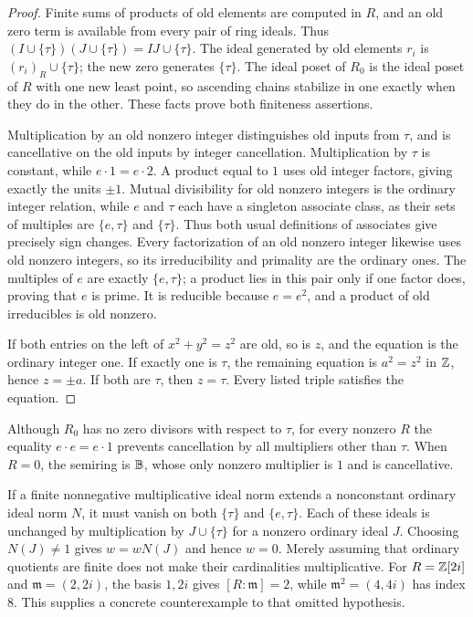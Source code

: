 \begin{proof}
Finite sums of products of old elements are computed in $R$, and an old
zero term is available from every pair of ring ideals. Thus
$(I\cup\{\tau\})(J\cup\{\tau\})=IJ\cup\{\tau\}$. The ideal generated by
old elements $r_i$ is $(r_i)_R\cup\{\tau\}$; the new zero generates
$\{\tau\}$. The ideal poset of $R_0$ is the ideal poset of $R$ with one
new least point, so ascending chains stabilize in one exactly when they
do in the other. These facts prove both finiteness assertions.

Multiplication by an old nonzero integer distinguishes old inputs from
$\tau$, and is cancellative on the old inputs by integer cancellation.
Multiplication by $\tau$ is constant, while $e\cdot1=e\cdot2$.
A product equal to $1$ uses old integer factors, giving exactly the
units $\pm1$. Mutual divisibility for old nonzero integers is the ordinary
integer relation, while $e$ and $\tau$ each have a singleton associate
class, as their sets of multiples are $\{e,\tau\}$ and $\{\tau\}$.
Thus both usual definitions of associates give precisely sign changes.
Every factorization of an old nonzero integer likewise
uses old nonzero integers, so its irreducibility and primality are the
ordinary ones. The multiples of $e$ are exactly $\{e,\tau\}$; a product
lies in this pair only if one factor does, proving that $e$ is prime.
It is reducible because $e=e^2$, and a product of old irreducibles is
old nonzero.

If both entries on the left of $x^2+y^2=z^2$ are old, so is $z$, and the
equation is the ordinary integer one. If exactly one is $\tau$, the
remaining equation is $a^2=z^2$ in $\mathbb Z$, hence $z=\pm a$. If both are
$\tau$, then $z=\tau$. Every listed triple satisfies the equation.
\end{proof}

Although $R_0$ has no zero divisors with respect to $\tau$, for every
nonzero $R$ the equality $e\cdot e=e\cdot1$ prevents cancellation by all
multipliers other than $\tau$. When $R=0$, the semiring is $\mathbb B$, whose
only nonzero multiplier is $1$ and is cancellative.

If a finite nonnegative multiplicative ideal norm extends a nonconstant
ordinary ideal norm $N$, it must vanish on both $\{\tau\}$ and
$\{e,\tau\}$. Each of these ideals is unchanged by multiplication by
$J\cup\{\tau\}$ for a nonzero ordinary ideal $J$. Choosing $N(J)\ne1$
gives $w=wN(J)$ and hence $w=0$. Merely assuming that ordinary quotients
are finite does not make their cardinalities multiplicative. For
$R=\mathbb Z[2i]$ and $\mathfrak m=(2,2i)$, the basis $1,2i$ gives
$[R:\mathfrak m]=2$, while $\mathfrak m^2=(4,4i)$ has index $8$.
This supplies a concrete counterexample to that omitted hypothesis.

